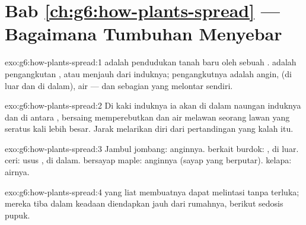 \section*{Bab \ref{ch:g6:how-plants-spread} --- Bagaimana Tumbuhan Menyebar}

\begin{solution}{exo:g6:how-plants-spread:1}
 adalah pendudukan tanah baru oleh sebuah .
 adalah pengangkutan ,  atau  menjauh dari
induknya; pengangkutnya adalah angin,  (di luar dan di dalam),
air --- dan sebagian  yang melontar sendiri.
\end{solution}

\begin{solution}{exo:g6:how-plants-spread:2}
Di kaki induknya ia akan  di dalam naungan induknya dan di
antara , bersaing memperebutkan  dan air melawan seorang
lawan yang seratus kali lebih besar. Jarak melarikan diri dari
pertandingan yang kalah itu.
\end{solution}

\begin{solution}{exo:g6:how-plants-spread:3}
Jambul jombang: anginnya.  berkait burdok:  , di luar.
 ceri: usus , di dalam.  bersayap maple: anginnya (sayap
yang berputar).  kelapa: airnya.
\end{solution}

\begin{solution}{exo:g6:how-plants-spread:4}
 yang liat membuatnya dapat melintasi  
tanpa terluka; mereka tiba dalam keadaan diendapkan jauh dari
rumahnya, berikut sedosis pupuk.
\end{solution}

